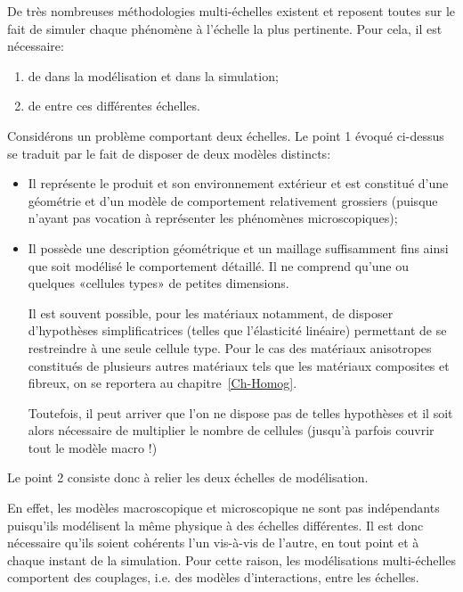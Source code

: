 \medskip
De très nombreuses méthodologies multi-échelles existent et reposent toutes sur le fait de simuler chaque phénomène à l'échelle la plus pertinente. Pour cela, il est nécessaire:
\begin{enumerate}
  \item de  dans la modélisation et dans la simulation;
  \item de  entre ces différentes échelles.
\end{enumerate}

\medskip
Considérons un problème comportant deux échelles. Le point 1 évoqué ci-dessus se traduit par le fait de disposer de deux modèles distincts:
\begin{itemize}
  \item {}

	Il représente le produit et son environnement extérieur et est constitué d'une géométrie et d'un modèle de comportement relativement grossiers (puisque n'ayant pas vocation à représenter les phénomènes microscopiques);
  \item {}

	Il possède une description géométrique et un maillage suffisamment fins ainsi que soit modélisé le comportement détaillé. Il ne comprend qu'une ou quelques «cellules types» de petites dimensions.

	Il est souvent possible, pour les matériaux notamment, de disposer d'hypothèses simplificatrices (telles que l'élasticité linéaire) permettant de se restreindre à une seule cellule type. Pour le cas des matériaux anisotropes constitués de plusieurs autres matériaux tels que les matériaux composites et fibreux, on se reportera au chapitre~\ref{Ch-Homog}. 

	Toutefois, il peut arriver que l'on ne dispose pas de telles hypothèses et il soit alors nécessaire de multiplier le nombre de cellules (jusqu'à parfois couvrir tout le modèle macro !)
\end{itemize}

\medskip
Le point 2 consiste donc à relier les deux échelles de modélisation.

En effet, les modèles macroscopique et microscopique ne sont pas indépendants puisqu'ils modélisent la même physique à des échelles différentes. Il est donc nécessaire qu'ils soient cohérents l'un vis-à-vis de l'autre, en tout point et à chaque instant de la simulation. Pour cette raison, les modélisations multi-échelles comportent des couplages, i.e. des modèles d'interactions, entre les échelles.

